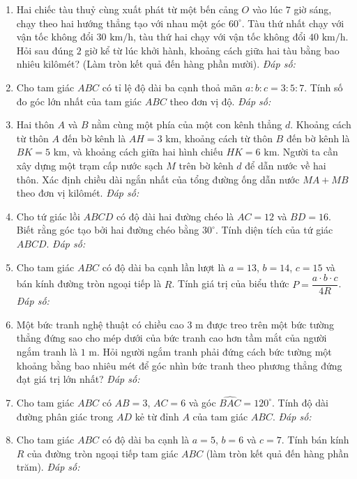 \documentclass[12pt,a4paper]{article}
\newcommand{\answerbox}{\hfill\textit{Đáp số:}\ \fbox{\rule{0pt}{9pt}\hspace{2.2cm}}}
\begin{document}
\begin{enumerate}[resume]
\item Hai chiếc tàu thuỷ cùng xuất phát từ một bến cảng $O$ vào lúc $7$ giờ sáng, chạy theo hai hướng thẳng tạo với nhau một góc $60^\circ$. Tàu thứ nhất chạy với vận tốc không đổi $30\text{ km/h}$, tàu thứ hai chạy với vận tốc không đổi $40\text{ km/h}$. Hỏi sau đúng $2$ giờ kể từ lúc khởi hành, khoảng cách giữa hai tàu bằng bao nhiêu kilômét? (Làm tròn kết quả đến hàng phần mười).
\answerbox

\item Cho tam giác $ABC$ có tỉ lệ độ dài ba cạnh thoả mãn $a : b : c = 3 : 5 : 7$. Tính số đo góc lớn nhất của tam giác $ABC$ theo đơn vị độ.
\answerbox

\item Hai thôn $A$ và $B$ nằm cùng một phía của một con kênh thẳng $d$. Khoảng cách từ thôn $A$ đến bờ kênh là $AH = 3\text{ km}$, khoảng cách từ thôn $B$ đến bờ kênh là $BK = 5\text{ km}$, và khoảng cách giữa hai hình chiếu $HK = 6\text{ km}$. Người ta cần xây dựng một trạm cấp nước sạch $M$ trên bờ kênh $d$ để dẫn nước về hai thôn. Xác định chiều dài ngắn nhất của tổng đường ống dẫn nước $MA + MB$ theo đơn vị kilômét.
\answerbox

\item Cho tứ giác lồi $ABCD$ có độ dài hai đường chéo là $AC = 12$ và $BD = 16$. Biết rằng góc tạo bởi hai đường chéo bằng $30^\circ$. Tính diện tích của tứ giác $ABCD$.
\answerbox

\item Cho tam giác $ABC$ có độ dài ba cạnh lần lượt là $a = 13$, $b = 14$, $c = 15$ và bán kính đường tròn ngoại tiếp là $R$. Tính giá trị của biểu thức $P = \dfrac{a \cdot b \cdot c}{4R}$.
\answerbox

\item Một bức tranh nghệ thuật có chiều cao $3\text{ m}$ được treo trên một bức tường thẳng đứng sao cho mép dưới của bức tranh cao hơn tầm mắt của người ngắm tranh là $1\text{ m}$. Hỏi người ngắm tranh phải đứng cách bức tường một khoảng bằng bao nhiêu mét để góc nhìn bức tranh theo phương thẳng đứng đạt giá trị lớn nhất?
\answerbox

\item Cho tam giác $ABC$ có $AB = 3$, $AC = 6$ và góc $\widehat{BAC} = 120^\circ$. Tính độ dài đường phân giác trong $AD$ kẻ từ đỉnh $A$ của tam giác $ABC$.
\answerbox

\item Cho tam giác $ABC$ có độ dài ba cạnh là $a = 5$, $b = 6$ và $c = 7$. Tính bán kính $R$ của đường tròn ngoại tiếp tam giác $ABC$ (làm tròn kết quả đến hàng phần trăm).
\answerbox
\end{enumerate}
\end{document}
